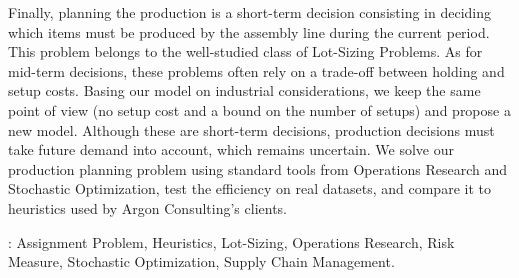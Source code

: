 Finally, planning the production is a short-term decision consisting in deciding which items must be produced by the assembly line during the current period.
This problem belongs to the well-studied class of Lot-Sizing Problems.
As for mid-term decisions, these problems often rely on a trade-off between holding and setup costs.
Basing our model on industrial considerations, we keep the same point of view (no setup cost and a bound on the number of setups) and propose a new model.
Although these are short-term decisions, production decisions must take future demand into account, which remains uncertain.
We solve our production planning problem using standard tools from Operations Research and Stochastic Optimization, test the efficiency on real datasets, and compare it to heuristics used by Argon Consulting's clients.


: Assignment Problem, Heuristics, Lot-Sizing, Operations Research, Risk Measure, Stochastic Optimization, Supply Chain Management.


